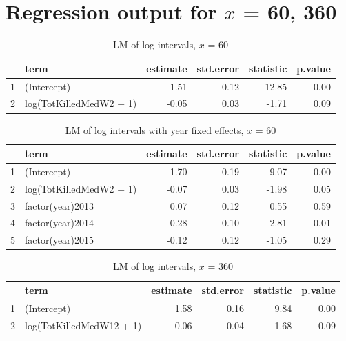 \documentclass[letterpaper,12pt]{article}
\theoremstyle{definition}
\begin{document}
\nocite {gill,jaeger,johnston2012,jordan2014,long,price}

 

\newpage
\appendix
\section{Regression output for $x$ = 60, 360}

\begin{table}[h!]
\centering
\caption {LM of log intervals, $x$ = 60}
\begin{tabular}{rlrrrr}
  \hline
 & term & estimate & std.error & statistic & p.value \\ 
  \hline
1 & (Intercept) & 1.51 & 0.12 & 12.85 & 0.00 \\ 
  2 & log(TotKilledMedW2 + 1) & -0.05 & 0.03 & -1.71 & 0.09 \\ 
   \hline
\end{tabular}
\end{table}

\begin{table}[h!]
\centering
\caption {LM of log intervals with year fixed effects, $x$ = 60}
\begin{tabular}{rlrrrr}
  \hline
 & term & estimate & std.error & statistic & p.value \\ 
  \hline
1 & (Intercept) & 1.70 & 0.19 & 9.07 & 0.00 \\ 
  2 & log(TotKilledMedW2 + 1) & -0.07 & 0.03 & -1.98 & 0.05 \\ 
  3 & factor(year)2013 & 0.07 & 0.12 & 0.55 & 0.59 \\ 
  4 & factor(year)2014 & -0.28 & 0.10 & -2.81 & 0.01 \\ 
  5 & factor(year)2015 & -0.12 & 0.12 & -1.05 & 0.29 \\ 
   \hline
\end{tabular}
\end{table}

\begin{table}[h!]
\centering
\caption {LM of log intervals, $x$ = 360}
\begin{tabular}{rlrrrr}
  \hline
 & term & estimate & std.error & statistic & p.value \\ 
  \hline
1 & (Intercept) & 1.58 & 0.16 & 9.84 & 0.00 \\ 
  2 & log(TotKilledMedW12 + 1) & -0.06 & 0.04 & -1.68 & 0.09 \\ 
   \hline
\end{tabular}
\end{table}
\end{document}
